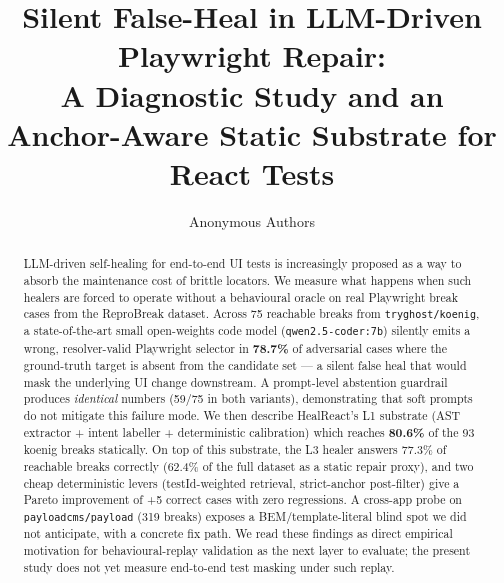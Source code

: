 \documentclass[sigconf,nonacm=true]{acmart}
\title{Silent False-Heal in LLM-Driven Playwright Repair:\\
       A Diagnostic Study and an Anchor-Aware Static Substrate for React Tests}
\author{Anonymous Authors}
\affiliation{\institution{Anonymous Institution}\country{}}
\begin{document}
\begin{abstract}
LLM-driven self-healing for end-to-end UI tests is increasingly proposed as a way to absorb the maintenance cost of brittle locators. We measure what happens when such healers are forced to operate without a behavioural oracle on real Playwright break cases from the ReproBreak dataset.
Across 75 reachable breaks from \texttt{tryghost/koenig}, a state-of-the-art small open-weights code model (\texttt{qwen2.5-coder:7b}) silently emits a wrong, resolver-valid Playwright selector in \textbf{78.7\%} of adversarial cases where the ground-truth target is absent from the candidate set --- a silent false heal that would mask the underlying UI change downstream. A prompt-level abstention guardrail produces \emph{identical} numbers (59/75 in both variants), demonstrating that soft prompts do not mitigate this failure mode.
We then describe HealReact's L1 substrate (AST extractor + intent labeller + deterministic calibration) which reaches \textbf{80.6\%} of the 93 koenig breaks statically. On top of this substrate, the L3 healer answers 77.3\% of reachable breaks correctly (62.4\% of the full dataset as a static repair proxy), and two cheap deterministic levers (testId-weighted retrieval, strict-anchor post-filter) give a Pareto improvement of +5 correct cases with zero regressions. A cross-app probe on \texttt{payloadcms/payload} (319 breaks) exposes a BEM/template-literal blind spot we did not anticipate, with a concrete fix path. We read these findings as direct empirical motivation for behavioural-replay validation as the next layer to evaluate; the present study does not yet measure end-to-end test masking under such replay.
\end{abstract}

\maketitle











\end{document}
